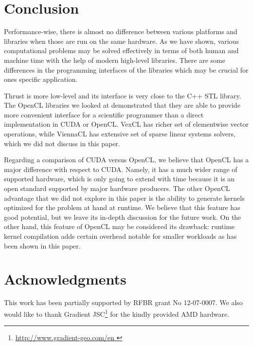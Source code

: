 \documentclass[1p]{elsarticle}
\begin{document}
% 
%
\section{Conclusion}

Performance-wise, there is almost no difference between various platforms and
libraries when those are run on the same hardware. As we have shown, various
computational problems may be solved effectively in terms of both human and
machine time with the help of modern high-level libraries.  There are some
differences in the programming interfaces of the libraries which may be crucial
for ones specific application. 

Thrust is more low-level and its interface is very close to the C++ STL
library.  The OpenCL libraries we looked at demonstrated that they are able to
provide more convenient interface for a scientific programmer than a direct
implementation in CUDA or OpenCL.  VexCL has richer set of elementwise vector
operations, while ViennaCL has extensive set of sparse linear systems solvers,
which we did not discuss in this paper.

Regarding a comparison of CUDA versus OpenCL, we believe that OpenCL has a
major difference with respect to CUDA. Namely, it has a  much wider range of
supported hardware, which is only going to extend with time because it is an
open standard supported by major hardware producers. The other OpenCL advantage
that we did not explore in this paper is the ability to generate kernels
optimized for the problem at hand at runtime. We believe that this feature has
good potential, but we leave its in-depth discussion for the future work.  On
the other hand, this feature of OpenCL may be considered its drawback: runtime
kernel compilation adds certain overhead notable for smaller workloads as has
been shown in this paper. 





\section{Acknowledgments}

This work has been partially supported by RFBR grant No 12-07-0007. We also
would like to thank Gradient JSC\footnote{ \href{
http://www.gradient-geo.com/en }{ http://www.gradient-geo.com/en } } for the
kindly provided AMD hardware.




\end{document}
